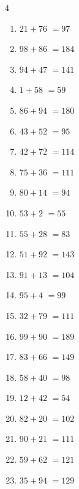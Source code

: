\begin{multicols}{4}
\begin{enumerate}
\columnbreak %

\resetques

  \item $21+76$
        $=97$

  \item $98+86$
        $=184$

  \item $94+47$
        $=141$

  \item $1+58$
        $=59$

  \item $86+94$
        $=180$

  \item $43+52$
        $=95$

  \item $42+72$
        $=114$

  \item $75+36$
        $=111$

  \item $80+14$
        $=94$

  \item $53+2$
        $=55$

  \item $55+28$
        $=83$

  \item $51+92$
        $=143$

  \item $91+13$
        $=104$

  \item $95+4$
        $=99$

  \item $32+79$
        $=111$

  \item $99+90$
        $=189$

  \item $83+66$
        $=149$

  \item $58+40$
        $=98$

  \item $12+42$
        $=54$

  \item $82+20$
        $=102$

  \item $90+21$
        $=111$

  \item $59+62$
        $=121$

  \item $35+94$
        $=129$


\end{enumerate}
\end{multicols}

